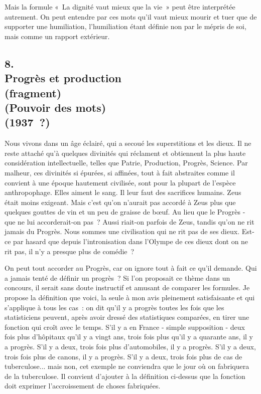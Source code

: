 \documentclass[french,twoside]{book} %
\begin{document}
Mais la formule « La dignité vaut mieux que la vie » peut être interprétée autrement. On peut entendre par ces mots qu'il vaut mieux mourir et tuer que de supporter une humiliation, l'humiliation étant définie non par le mépris de soi, mais comme un rapport extérieur.\par

\begin{center}
\noindent \centerline{}
\end{center}

\subsection[{8. Progrès et production, (fragment) (Pouvoir des mots)  (1937 ?)}]{8. \\
Progrès et production \\
(fragment) \\
(Pouvoir des mots) \protect\footnotemark {\itshape  }\\
(1937 ?)}
\noindent \par
Nous vivons dans un âge éclairé, qui a secoué les superstitions et les dieux. Il ne reste attaché qu'à quelques divinités qui réclament et obtiennent la plus haute considération intellectuelle, telles que Patrie, Production, Progrès, Science. Par malheur, ces divinités si épurées, si affinées, tout à fait abstraites comme il convient à une époque hautement civilisée, sont pour la plupart de l'espèce anthropophage. Elles aiment le sang. Il leur faut des sacrifices humains. Zeus était moins exigeant. Mais c'est qu'on n'aurait pas accordé à Zeus plus que quelques gouttes de vin et un peu de graisse de bœuf. Au lieu que le Progrès - que ne lui accorderait-on pas ? Aussi riait-on parfois de Zeus, tandis qu'on ne rit jamais du Progrès. Nous sommes une civilisation qui ne rit pas de ses dieux. Est-ce par hasard que depuis l'intronisation dans l'Olympe de ces dieux dont on ne rit pas, il n'y a presque plus de comédie ?\par
On peut tout accorder au Progrès, car on ignore tout à fait ce qu'il demande. Qui a jamais tenté de définir un progrès ? Si l'on proposait ce thème dans un concours, il serait sans doute instructif et amusant de comparer les formules. Je propose la définition que voici, la seule à mon avis pleinement satisfaisante et qui s'applique à tous les cas : on dit qu'il y a progrès toutes les fois que les statisticiens peuvent, après avoir dressé des statistiques compa­rées, en tirer une fonction qui croît avec le temps. S'il y a en France - simple supposition - deux fois plus d'hôpitaux qu'il y a vingt ans, trois fois plus qu'il y a quarante ans, il y a progrès. S'il y a deux, trois fois plus d'automobiles, il y a progrès. S'il y a deux, trois fois plus de canons, il y a progrès. S'il y a deux, trois fois plus de cas de tuberculose... mais non, cet exemple ne conviendra que le jour où on fabriquera de la tuberculose. Il convient d'ajouter à la définition ci-dessus que la fonction doit exprimer l'accroissement de choses fabriquées.\par
\end{document}
